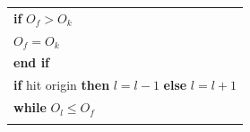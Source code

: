 \begin{table}
\begin{minipage}[b]{8cm}
\begin{tabular}{p{7cm}}
\\
\hspace{4mm}\textbf{if} $O_{f} > O_{k}$
\\
\hspace{7mm}$O_{f} = O_{k}$
\\
\hspace{4mm}\textbf{end if}
\\
\hspace{4mm}\textbf{if} hit origin \textbf{then} $l=l-1$ \textbf{else} $l=l+1$
\\
\textbf{while} $O_l \le O_{f}$
\\
\hline
\label{online}
\end{tabular}
\end{minipage}
\end{table}
